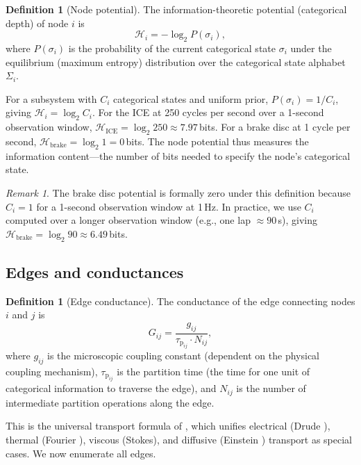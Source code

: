 \documentclass[twocolumn,10pt,a4paper]{article}
\theoremstyle{definition}
\newtheorem{definition}[theorem]{Definition}
\theoremstyle{remark}
\newtheorem{remark}[theorem]{Remark}
\newcommand{\Hcal}{\mathcal{H}}
\newcommand{\tauP}{\tau_{\mathrm{p}}}
\begin{document}
\begin{definition}[Node potential]\label{def:node_potential}
The information-theoretic potential (categorical depth) of node $i$ is
\begin{equation}\label{eq:node_potential}
    \Hcal_i = -\log_2 P(\sigma_i),
\end{equation}
where $P(\sigma_i)$ is the probability of the current categorical state $\sigma_i$ under the equilibrium (maximum entropy) distribution over the categorical state alphabet $\Sigma_i$.
\end{definition}

For a subsystem with $C_i$ categorical states and uniform prior, $P(\sigma_i) = 1/C_i$, giving $\Hcal_i = \log_2 C_i$. For the ICE at 250 cycles per second over a 1-second observation window, $\Hcal_{\mathrm{ICE}} = \log_2 250 \approx 7.97$\,bits. For a brake disc at 1 cycle per second, $\Hcal_{\mathrm{brake}} = \log_2 1 = 0$\,bits. The node potential thus measures the information content---the number of bits needed to specify the node's categorical state.

\begin{remark}
The brake disc potential is formally zero under this definition because $C_i = 1$ for a 1-second observation window at 1\,Hz. In practice, we use $C_i$ computed over a longer observation window (e.g., one lap $\approx 90$\,s), giving $\Hcal_{\mathrm{brake}} = \log_2 90 \approx 6.49$\,bits.
\end{remark}

\subsection{Edges and conductances}

\begin{definition}[Edge conductance]\label{def:conductance}
The conductance of the edge connecting nodes $i$ and $j$ is
\begin{equation}\label{eq:conductance}
    G_{ij} = \frac{g_{ij}}{\tauP_{ij} \cdot N_{ij}},
\end{equation}
where $g_{ij}$ is the microscopic coupling constant (dependent on the physical coupling mechanism), $\tauP_{ij}$ is the partition time (the time for one unit of categorical information to traverse the edge), and $N_{ij}$ is the number of intermediate partition operations along the edge.
\end{definition}

This is the universal transport formula of \citep{Sachikonye2026circuitgraph}, which unifies electrical (Drude \citep{Drude1900}), thermal (Fourier \citep{Fourier1822}), viscous (Stokes), and diffusive (Einstein \citep{Einstein1905}) transport as special cases. We now enumerate all edges.
\end{document}
